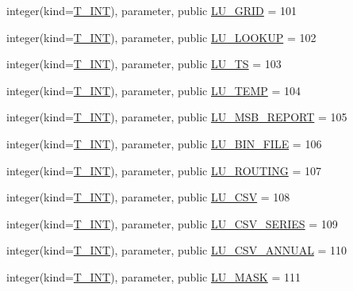 \begin{DoxyCompactItemize}
\item 
integer(kind=\hyperlink{namespacetypes_a4e4d040a4425196c4d43be63e7e6103a}{T\_\-INT}), parameter, public \hyperlink{namespacetypes_a47b83df3491e1221a3ac68ddffeaa66d}{LU\_\-GRID} = 101
\item 
integer(kind=\hyperlink{namespacetypes_a4e4d040a4425196c4d43be63e7e6103a}{T\_\-INT}), parameter, public \hyperlink{namespacetypes_ae0b1a59e6856a4e2976c65cfe6e7829a}{LU\_\-LOOKUP} = 102
\item 
integer(kind=\hyperlink{namespacetypes_a4e4d040a4425196c4d43be63e7e6103a}{T\_\-INT}), parameter, public \hyperlink{namespacetypes_ade712eb10655f5aee16cf18185a3681a}{LU\_\-TS} = 103
\item 
integer(kind=\hyperlink{namespacetypes_a4e4d040a4425196c4d43be63e7e6103a}{T\_\-INT}), parameter, public \hyperlink{namespacetypes_ad52e13854a39857c28903d06b6743e5c}{LU\_\-TEMP} = 104
\item 
integer(kind=\hyperlink{namespacetypes_a4e4d040a4425196c4d43be63e7e6103a}{T\_\-INT}), parameter, public \hyperlink{namespacetypes_aa997f1b516b3fe69d84925827bb1f85f}{LU\_\-MSB\_\-REPORT} = 105
\item 
integer(kind=\hyperlink{namespacetypes_a4e4d040a4425196c4d43be63e7e6103a}{T\_\-INT}), parameter, public \hyperlink{namespacetypes_aa6744b73e58d8433783e0f423c3a1a72}{LU\_\-BIN\_\-FILE} = 106
\item 
integer(kind=\hyperlink{namespacetypes_a4e4d040a4425196c4d43be63e7e6103a}{T\_\-INT}), parameter, public \hyperlink{namespacetypes_a94d564eb241f924a1114890a7e8a6901}{LU\_\-ROUTING} = 107
\item 
integer(kind=\hyperlink{namespacetypes_a4e4d040a4425196c4d43be63e7e6103a}{T\_\-INT}), parameter, public \hyperlink{namespacetypes_a02191e0a119334a646624bf66c6032d0}{LU\_\-CSV} = 108
\item 
integer(kind=\hyperlink{namespacetypes_a4e4d040a4425196c4d43be63e7e6103a}{T\_\-INT}), parameter, public \hyperlink{namespacetypes_a3b64a784a138287166d3c1717c8fc641}{LU\_\-CSV\_\-SERIES} = 109
\item 
integer(kind=\hyperlink{namespacetypes_a4e4d040a4425196c4d43be63e7e6103a}{T\_\-INT}), parameter, public \hyperlink{namespacetypes_afc45706ea53210eeba59fbe5b2b3856c}{LU\_\-CSV\_\-ANNUAL} = 110
\item 
integer(kind=\hyperlink{namespacetypes_a4e4d040a4425196c4d43be63e7e6103a}{T\_\-INT}), parameter, public \hyperlink{namespacetypes_adf298bd69751153dbb8bd21ec8bbc42b}{LU\_\-MASK} = 111
\item 

\end{DoxyCompactItemize}
